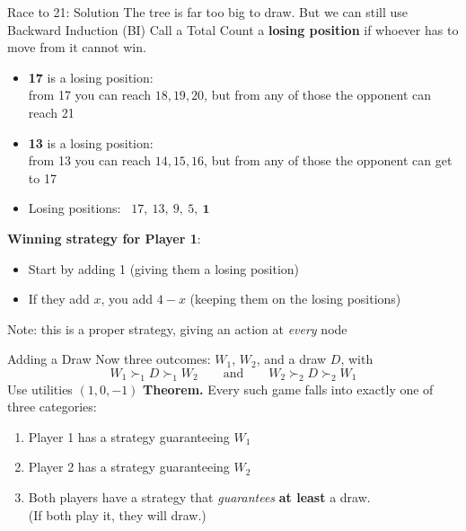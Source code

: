 \begin{frame}{Race to 21: Solution}
The tree is far too big to draw. But we can still use Backward Induction (BI)
\bsk
Call a Total Count a \textbf{losing position} if whoever has to move from it cannot win.
\bsk
\begin{itemize}
    \item \textbf{17} is a losing position:\\
    from 17 you can reach $18,19,20$, but from any of those the opponent can reach 21 \vspace{0.2in}
    \item \textbf{13} is a losing position:\\
    from 13 you can reach $14,15,16$,
      but from any of those the opponent can get to 17 \vspace{0.2in}
    \item Losing positions: \ $17,\ 13,\ 9,\ 5,\ \mathbf{1}$
\end{itemize}
\textbf{Winning strategy for Player 1}:
\begin{itemize}
    \item Start by adding 1 (giving them a losing position)
    \item If they add $x$, you add $4-x$ (keeping them on the losing positions)
\end{itemize}
Note: this is a proper strategy, giving an action at \textit{every} node
\end{frame}


\begin{frame}{Adding a Draw}
Now three outcomes: $W_1$, $W_2$, and a draw $D$, with
$$W_1\succ_1 D\succ_1 W_2 \qquad\text{and}\qquad W_2\succ_2 D\succ_2 W_1$$
Use utilities $(1,0,-1)$
\bsk
\textbf{Theorem.} Every such game falls into exactly one of three categories:
\begin{enumerate}
    \item Player 1 has a strategy guaranteeing $W_1$
    \item Player 2 has a strategy guaranteeing $W_2$
    \item Both players have a strategy that \textit{guarantees} \textbf{at least} a draw.\\(If both play it, they will draw.)
\end{enumerate}
\end{frame}

